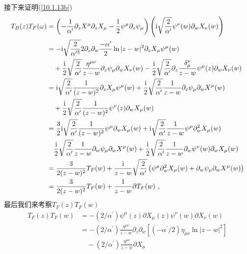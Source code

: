 \begin{tcolorbox}[breakable]
接下来证明(\ref{10.1.13b})%
\begin{align*}
T_{B}(z)T_{F}(\omega ) &=\left( -\frac{1}{\alpha ^{\prime }}\partial
_{z}X^{\mu }\partial _{z}X_{\mu }-\frac{1}{2}\psi ^{\mu }\partial _{z}\psi
_{\mu }\right) \left( \mi\sqrt{\frac{2}{\alpha ^{\prime }}}\psi ^{\nu
}(w)\partial _{w}X_{\nu }(w)\right)  \\
&=-\mi\sqrt{\frac{2}{\alpha ^{\prime 3}}}2\partial _{z}\partial _{w}\frac{%
-\alpha ^{\prime }}{2}\ln |z-w|^{2}\partial _{z}X_{\mu }\psi ^{\mu }(w) \\
&\quad+\frac{\mi}{2}\sqrt{\frac{2}{\alpha ^{\prime }}}\frac{\eta ^{\mu \nu }}{z-w}%
\partial _{z}\psi _{\mu }\partial _{w}X_{\nu }(w)-\frac{\mi}{2}\sqrt{\frac{2}{%
\alpha ^{\prime }}}\partial _{z}\frac{\delta _{\mu }^{\nu }}{z-w}\psi ^{\mu
}(z)\partial _{w}X_{\nu }(w) \\
&=\mi\sqrt{\frac{2}{\alpha ^{\prime }}}\frac{1}{(z-w)^{2}}\partial _{z}X_{\mu
}\psi ^{\mu }(w)+\frac{\mi}{2}\sqrt{\frac{2}{\alpha ^{\prime }}}\frac{1}{z-w}%
\partial _{z}\psi _{\mu }\partial _{w}X^{\mu }(w) \\
&\quad+\frac{\mi}{2}\sqrt{\frac{2}{\alpha ^{\prime }}}\frac{1}{(z-w)^{2}}\psi
^{\nu }(z)\partial _{w}X_{\mu }(w) \\
&=\frac{3}{2}\mi\sqrt{\frac{2}{\alpha ^{\prime }}}\frac{1}{(z-w)^{2}}\psi
^{\mu }\partial _{w}X_{\mu }(w)+\mi\sqrt{\frac{2}{\alpha ^{\prime }}}\frac{1}{%
z-w}\psi ^{\mu }\partial _{w}^{2}X_{\mu }(w) \\
&\quad\frac{\mi}{2}\sqrt{\frac{2}{\alpha ^{\prime }}}\frac{1}{z-w}\partial
_{w}\psi _{\mu }\partial _{w}X^{\mu }(w)+\frac{\mi}{2}\sqrt{\frac{2}{\alpha
^{\prime }}}\frac{1}{z-w}\partial _{w}\psi ^{\nu }(w)\partial _{w}X_{\mu }(w)\\
&=\frac{3}{2(z-w)^{2}}T_{F}(w)+\frac{\mi}{z-w}\sqrt{\frac{2}{\alpha ^{\prime }%
}}\left( \psi ^{\mu }\partial _{w}^{2}X_{\mu }(w)+\partial _{w}\psi _{\mu
}\partial _{w}X^{\mu }(w)\right)  \\
&=\frac{3}{2(z-w)^{2}}T_{F}(w)+\frac{1}{z-w}\partial T_{F}(w)\text{ ,}
\end{align*}
最后我们来考察$T_{F}(z)T_{F}(w)$
\begin{align*}
T_{F}(z)T_{F}(w) &=-(2/\alpha ^{\prime })\psi ^{\mu }(z)\partial X_{\mu
}(z)\psi ^{\nu }(w)\partial X_{\nu }(w) \\
&=-(2/\alpha ^{\prime })\frac{\eta ^{\mu \nu }}{z-w}\partial _{z}\partial
_{w}[(-\alpha ^{\prime }/2)\eta _{\mu \nu }\ln |z-w|^{2}] \\
&\quad-(2/\alpha ^{\prime })\frac{\eta ^{\mu \nu }}{z-w}\partial X_{\mu
}
\end{align*}
\end{tcolorbox}
